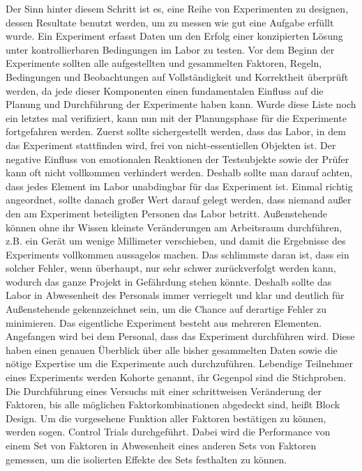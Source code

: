     Der Sinn hinter diesem Schritt ist es, eine Reihe von Experimenten zu designen, dessen 
    Resultate benutzt werden, um zu messen wie gut eine Aufgabe erfüllt wurde. Ein Experiment 
    erfasst Daten um den Erfolg einer konzipierten Lösung unter kontrollierbaren Bedingungen im Labor 
    zu testen. 
    \newpage
    Vor dem Beginn der Experimente sollten alle aufgestellten und gesammelten Faktoren, 
    Regeln, Bedingungen und Beobachtungen auf Vollständigkeit und Korrektheit überprüft werden, da 
    jede dieser Komponenten einen fundamentalen Einfluss auf die Planung und Durchführung der 
    Experimente haben kann.  Wurde diese Liste noch ein letztes mal verifiziert,  kann nun mit 
    der Planungsphase für die Experimente fortgefahren werden. 
    Zuerst sollte sichergestellt werden, dass das Labor, in dem das Experiment stattfinden wird, 
    frei von nicht-essentiellen Objekten ist. Der negative Einfluss von emotionalen Reaktionen der 
    Testsubjekte sowie der Prüfer kann oft nicht vollkommen verhindert werden. Deshalb sollte man 
    darauf achten, dass jedes Element im Labor unabdingbar für das Experiment ist. Einmal richtig 
    angeordnet, sollte danach großer Wert darauf gelegt werden, dass niemand außer den am Experiment 
    beteiligten Personen das Labor betritt. Außenstehende können ohne ihr Wissen kleinste Veränderungen 
    am Arbeitsraum durchführen, z.B. ein Gerät um wenige Millimeter verschieben, und damit die 
    Ergebnisse des Experiments vollkommen aussagelos machen. Das schlimmste daran ist, dass ein 
    solcher Fehler, wenn überhaupt, nur sehr schwer zurückverfolgt werden kann, wodurch das ganze 
    Projekt in Gefährdung stehen könnte. Deshalb sollte das Labor in Abwesenheit des Personals 
    immer verriegelt und klar und deutlich für Außenstehende gekennzeichnet sein, um die Chance 
    auf derartige Fehler zu minimieren. Das eigentliche Experiment besteht aus mehreren Elementen. 
    Angefangen wird bei dem Personal, dass das Experiment durchführen wird. Diese haben einen 
    genauen Überblick über alle bisher gesammelten Daten sowie die nötige Expertise um die 
    Experimente auch durchzuführen. Lebendige Teilnehmer eines Experiments werden Kohorte genannt, 
    ihr Gegenpol sind die Stichproben. Die Durchführung eines Versuchs mit einer schrittweisen 
    Veränderung der Faktoren, bis alle möglichen Faktorkombinationen abgedeckt sind, heißt Block 
    Design. Um die vorgesehene Funktion aller Faktoren bestätigen zu können, werden sogen. Control 
    Trials durchgeführt. Dabei wird die Performance von einem Set von Faktoren in Abwesenheit eines 
    anderen Sets von Faktoren gemessen, um die isolierten Effekte des Sets festhalten zu können. 

